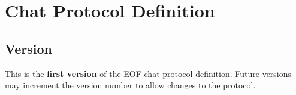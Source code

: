 \chapter{Chat Protocol Definition}
\section{Version}
This is the \textbf{first version} of the EOF chat protocol definition.
Future versions may increment the version number to allow changes to the
protocol.
